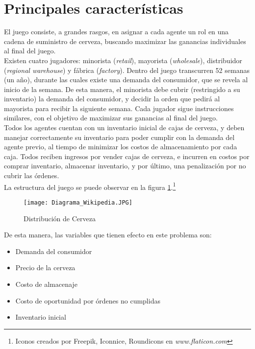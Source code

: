 \section{Principales caracter\'isticas}

El juego consiste, a grandes rasgos, en asignar a cada agente un rol en una cadena de suministro de cerveza, buscando maximizar las ganancias individuales al final del juego.\\

Existen cuatro jugadores: minorista (\textit{retail}), mayorista (\textit{wholesale}), distribuidor (\textit{regional warehouse}) y f\'abrica (\textit{factory}). Dentro del juego transcurren 52 semanas (un a\~no), durante las cuales existe una demanda del consumidor, que se revela al inicio de la semana. De esta manera, el minorista debe cubrir (restringido a su inventario) la demanda del consumidor, y decidir la orden que pedir\'a al mayorista para recibir la siguiente semana. Cada jugador sigue instrucciones similares, con el objetivo de maximizar sus ganancias al final del juego.\\

Todos los agentes cuentan con un inventario inicial de cajas de cerveza,  y deben manejar correctamente su inventario para poder cumplir con la demanda del agente previo, al tiempo de minimizar los costos de almacenamiento por cada caja. Todos reciben ingresos por vender cajas de cerveza, e incurren en costos por comprar inventario, almacenar inventario, y por \'ultimo, una penalizaci\'on por no cubrir las \'ordenes.\\

La estructura del juego se puede observar en la figura \ref{diagram_wikipedia}.\footnote{Iconos creados por Freepik, Iconnice, Roundicons en \textit{www.flaticon.com}}\\


\begin{figure}[h]
\caption{Distribución de Cerveza}
\label{diagram_wikipedia}
\texttt{[image: Diagrama\_Wikipedia.JPG]}
\centering
\end{figure}

De esta manera, las variables que tienen efecto en este problema son:

\begin{itemize}
    \item Demanda del consumidor
    \item Precio de la cerveza
    \item Costo de almacenaje
    \item Costo de oportunidad por \'ordenes no cumplidas
    \item Inventario inicial
\end{itemize}

